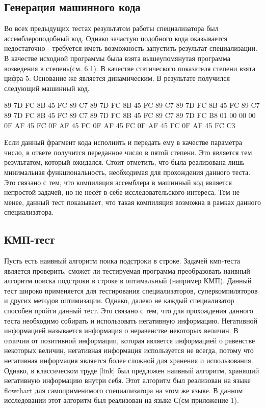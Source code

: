 \documentclass{spbau-diploma}
\begin{document}
\subsection{ Генерация машинного кода}
Во всех предыдущих тестах результатом работы специализатора был ассемблероподобный код. Однако зачастую подобного кода оказывается недостаточно - требуется иметь возможность запустить результат специализации. В качестве исходной программы была взята вышеупомянутая программа возведения в степень(см. 6.1). В качестве статического показателя степени взята цифра $5$. Основание же является динамическим. В результате получился следующий машинный код.

89 7D FC 8B 45 FC 89 C7 89 7D FC 8B 45 FC 89 C7 89 7D FC 8B 45 FC 89 C7 89 7D FC 8B 45 FC 89 C7 89 7D FC 8B 45 FC 89 C7 89 7D FC B8 01 00 00 00 0F AF 45 FC 0F AF 45 FC 0F AF 45 FC 0F AF 45 FC 0F AF 45 FC C3

Если данный фрагмент кода исполнить и передать ему в качестве параметра число, в ответе получится переданное число в пятой степени. Это является тем результатом, который ожидался. Стоит отметить, что была реализована лишь минимальная функциональность, необходимая для прохождения данного теста. Это связано с тем, что компиляция ассемблера в машинный код является непростой задачей, но не несёт в себе исследовательского интереса. Тем не менее, данный тест показывает, что такая компиляция возможна в рамках данного специализатора.

\subsection{ КМП-тест}
Пусть есть наивный алгоритм поика подстроки в строке. Задачей кмп-теста является проверить, сможет ли тестируемая программа преобразовать наивный алгоритм поиска подстроки в строке в оптимальный (например КМП). Данный тест широко применяется для тестирования специализаторов, суперкомпиляторов и других методов оптимизации. Однако, далеко не каждый специализатор способен пройти данный тест. Это связано с тем, что для прохождения данного теста необходимо собирать и использовать негативную информацию. Негативной информацией называется информация о неравенстве некоторых величин. В отличии от позитивной информации, которая является информацией о равенстве некоторых величин, негативная информация используется не всегда, потому что негативная информация является более сложной для хранения и использования. Однако, в классическом труде [link] был предложен наивный алгоритм, хранящий негативную информацию внутри себя. Этот алгоритм был реализован на языке flowchart для самоприменимого специализатора на этом же языке. В данном исследовании этот алгоритм был реализован на языке С(см приложение 1). 
\end{document}
